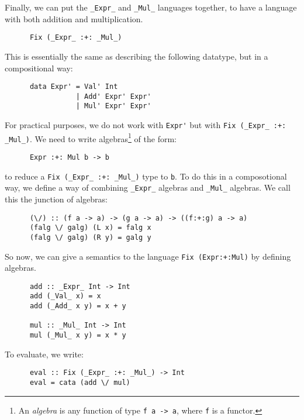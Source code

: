 \documentclass[a4paper,12pt]{article}
\theoremstyle{remark}
\begin{document}
  Finally, we can put the \lstinline{_Expr_} and \lstinline{_Mul_} languages together, to have a language with
  both addition and multiplication.

  \begin{lstlisting}
      Fix (_Expr_ :+: _Mul_)  \end{lstlisting}

  This is essentially the same as describing the following datatype, but in a
  compositional way:

  \begin{lstlisting}
      data Expr' = Val' Int
                 | Add' Expr' Expr'
                 | Mul' Expr' Expr'  \end{lstlisting}

  For practical purposes, we do not work with \lstinline{Expr'} but with \lstinline{Fix (_Expr_ :+: _Mul_)}.
  We need to write algebras\footnote{An \textit{algebra} is any function of type \lstinline{f a -> a},
  where \lstinline{f} is a functor.} of the form:

  \begin{lstlisting}
      Expr :+: Mul b -> b  \end{lstlisting}

  to reduce a \lstinline{Fix (_Expr_ :+: _Mul_)} type to  \lstinline{b}. To do this in a composotional way,
  we define a way of combining \lstinline{_Expr_} algebras and \lstinline{_Mul_} algebras. We call this the
  junction of algebras:

  \begin{lstlisting}
      (\/) :: (f a -> a) -> (g a -> a) -> ((f:+:g) a -> a)
      (falg \/ galg) (L x) = falg x
      (falg \/ galg) (R y) = galg y  \end{lstlisting}

  So now, we can give a semantics to the language \lstinline{Fix (Expr:+:Mul)} by defining algebras.

  \begin{lstlisting}
      add :: _Expr_ Int -> Int
      add (_Val_ x) = x
      add (_Add_ x y) = x + y

      mul :: _Mul_ Int -> Int
      mul (_Mul_ x y) = x * y  \end{lstlisting}

  To evaluate, we write:

  \begin{lstlisting}
      eval :: Fix (_Expr_ :+: _Mul_) -> Int
      eval = cata (add \/ mul)  \end{lstlisting}
\end{document}
